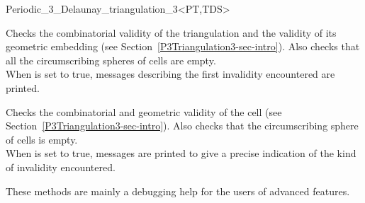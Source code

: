 \begin{ccRefClass}{Periodic_3_Delaunay_triangulation_3<PT,TDS>}
\begin{ccAdvanced}
{Checks the combinatorial validity of the triangulation and the
validity of its geometric embedding (see
Section~\ref{P3Triangulation3-sec-intro}). Also checks that all the
circumscribing spheres of cells are empty.\\
When  is set to true,  messages describing the first
invalidity encountered are printed.}

{Checks the combinatorial and geometric validity of the cell (see
Section~\ref{P3Triangulation3-sec-intro}). Also checks that the
circumscribing sphere of cells is empty.\\
When  is set to true, messages are printed to give
a precise indication of the kind of invalidity encountered.}

These methods are  mainly a debugging help for the users of advanced features.
\end{ccAdvanced}

\ccSeeAlso




\end{ccRefClass}
